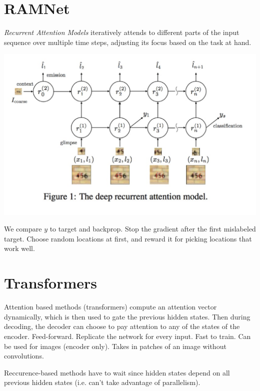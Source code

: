 \section{RAMNet}
\textit{Recurrent Attention Models} iteratively attends to different parts of the input sequence over multiple time steps, adjusting its focus based on the task at hand.

\includegraphics[width=0.9\columnwidth]{images/RAM.png}

We compare $y$ to target and backprop. Stop the gradient after the first mislabeled target. Choose random locations at first, and reward it for picking locations that work well. 

\section{Transformers}
Attention based methods (transformers) compute an attention vector dynamically, which is then used to gate the previous hidden states. Then during decoding, the decoder can choose to pay attention to any of the states of the encoder. Feed-forward. Replicate the network for every input. Fast to train. Can be used for images (encoder only). Takes in patches of an image without convolutions.

Reccurence-based methods have to wait since hidden states depend on all previous hidden states (i.e. can't take advantage of parallelism).
